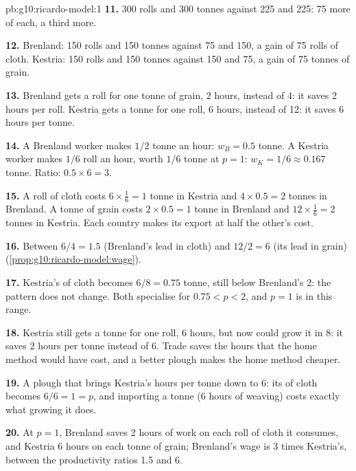 \begin{solution}{pb:g10:ricardo-model:1}
\textbf{11.} 300 rolls and 300 tonnes against 225 and 225: 75 more of each, a third more.

\textbf{12.} Brenland: 150 rolls and 150 tonnes against 75 and 150, a gain of 75 rolls of cloth. Kestria: 150 rolls and
150 tonnes against 150 and 75, a gain of 75 tonnes of grain.

\textbf{13.} Brenland gets a roll for one tonne of grain, 2 hours, instead of 4: it saves 2 hours per roll. Kestria gets a
tonne for one roll, 6 hours, instead of 12: it saves 6 hours per tonne.

\textbf{14.} A Brenland worker makes $1/2$ tonne an hour: $w_B = 0.5$ tonne. A Kestria worker makes $1/6$ roll an hour,
worth $1/6$ tonne at $p = 1$: $w_K = 1/6 \approx 0.167$ tonne. Ratio: $0.5 \times 6 = 3$.

\textbf{15.} A roll of cloth costs $6 \times \tfrac16 = 1$ tonne in Kestria and $4 \times 0.5 = 2$ tonnes in Brenland. A
tonne of grain costs $2 \times 0.5 = 1$ tonne in Brenland and $12 \times \tfrac16 = 2$ tonnes in Kestria. Each country
makes its export at half the other's cost.

\textbf{16.} Between $6/4 = 1.5$ (Brenland's lead in cloth) and $12/2 = 6$ (its lead in grain)
(\cref{prop:g10:ricardo-model:wage}).

\textbf{17.} Kestria's  of cloth becomes $6/8 = 0.75$ tonne, still below Brenland's 2: the pattern does not
change. Both specialise for $0.75 < p < 2$, and $p = 1$ is in this range.

\textbf{18.} Kestria still gets a tonne for one roll, 6 hours, but now could grow it in 8: it saves 2 hours per tonne
instead of 6. Trade saves the hours that the home method would have cost, and a better plough makes the home method
cheaper.

\textbf{19.} A plough that brings Kestria's hours per tonne down to 6: its  of cloth becomes $6/6 = 1 = p$,
and importing a tonne (6 hours of weaving) costs exactly what growing it does.

\textbf{20.} At $p = 1$, Brenland saves 2 hours of work on each roll of cloth it consumes, and Kestria 6 hours on each
tonne of grain; Brenland's wage is 3 times Kestria's, between the productivity ratios 1.5 and 6.
\end{solution}
